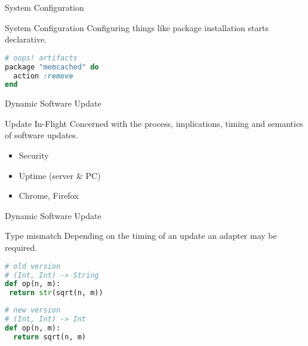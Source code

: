 \documentclass{beamer}
\begin{document}
\begin{frame}[fragile]{System Configuration}
  \begin{block}{System Configuration}
    Configuring things like package installation starts declarative.
  \end{block}

  \begin{example}
    \begin{center}
      \begin{minipage}{.48\textwidth}
        
        \vspace{0.94cm}
      \end{minipage}
      \hfill
      \begin{minipage}{.48\textwidth}
        \begin{lstlisting}[language=ruby]
# oops! artifacts
package "memcached" do
  action :remove
end
        \end{lstlisting}
      \end{minipage}
    \end{center}
  \end{example}
\end{frame}

\begin{frame}[fragile]{Dynamic Software Update}
  \begin{block}{Update In-Flight}
    Concerned with the process, implications, timing and semantics of software updates.
  \end{block}

  \begin{itemize}
    \item Security
    \item Uptime (server \& PC)
    \item Chrome, Firefox
  \end{itemize}
\end{frame}

\begin{frame}[fragile]{Dynamic Software Update}
  \begin{block}{Type mismatch}
    Depending on the timing of an update an adapter may be required.
  \end{block}

  \begin{example}
    \begin{center}
      \begin{minipage}{.54\textwidth}
        \begin{lstlisting}[language=python]
# old version
# (Int, Int) -> String
def op(n, m):
 return str(sqrt(n, m))
        \end{lstlisting}
      \end{minipage}
      \hfill
      \begin{minipage}{.45\textwidth}
        \begin{lstlisting}[language=python]
# new version
# (Int, Int) -> Int
def op(n, m):
  return sqrt(n, m)
        \end{lstlisting}
      \end{minipage}
    \end{center}
  \end{example}
\end{frame}
\end{document}
